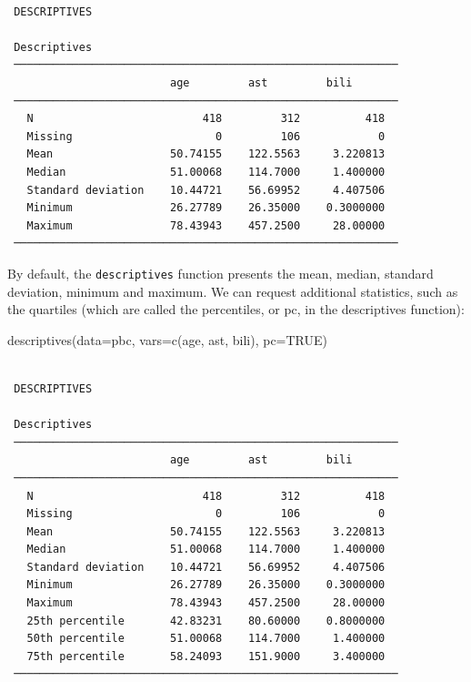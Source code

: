 \documentclass[
  a4paper,
]{memoir}
\newenvironment{Shaded}{\begin{snugshade}}{\end{snugshade}}
\newcommand{\AttributeTok}[1]{\textcolor[rgb]{0.00,0.00,0.00}{#1}}
\newcommand{\ConstantTok}[1]{\textcolor[rgb]{0.00,0.00,0.00}{#1}}
\newcommand{\FunctionTok}[1]{\textcolor[rgb]{0.00,0.00,0.00}{#1}}
\newcommand{\NormalTok}[1]{\textcolor[rgb]{0.00,0.00,0.00}{#1}}
\begin{document}
\begin{verbatim}

 DESCRIPTIVES

 Descriptives                                                
 ─────────────────────────────────────────────────────────── 
                         age         ast         bili        
 ─────────────────────────────────────────────────────────── 
   N                          418         312          418   
   Missing                      0         106            0   
   Mean                  50.74155    122.5563     3.220813   
   Median                51.00068    114.7000     1.400000   
   Standard deviation    10.44721    56.69952     4.407506   
   Minimum               26.27789    26.35000    0.3000000   
   Maximum               78.43943    457.2500     28.00000   
 ─────────────────────────────────────────────────────────── 
\end{verbatim}

By default, the \texttt{descriptives} function presents the mean,
median, standard deviation, minimum and maximum. We can request
additional statistics, such as the quartiles (which are called the
percentiles, or pc, in the descriptives function):

\begin{Shaded}
\begin{Highlighting}[]
\FunctionTok{descriptives}\NormalTok{(}\AttributeTok{data=}\NormalTok{pbc, }\AttributeTok{vars=}\FunctionTok{c}\NormalTok{(age, ast, bili), }\AttributeTok{pc=}\ConstantTok{TRUE}\NormalTok{)}
\end{Highlighting}
\end{Shaded}

\begin{verbatim}

 DESCRIPTIVES

 Descriptives                                                
 ─────────────────────────────────────────────────────────── 
                         age         ast         bili        
 ─────────────────────────────────────────────────────────── 
   N                          418         312          418   
   Missing                      0         106            0   
   Mean                  50.74155    122.5563     3.220813   
   Median                51.00068    114.7000     1.400000   
   Standard deviation    10.44721    56.69952     4.407506   
   Minimum               26.27789    26.35000    0.3000000   
   Maximum               78.43943    457.2500     28.00000   
   25th percentile       42.83231    80.60000    0.8000000   
   50th percentile       51.00068    114.7000     1.400000   
   75th percentile       58.24093    151.9000     3.400000   
 ─────────────────────────────────────────────────────────── 
\end{verbatim}
\end{document}
